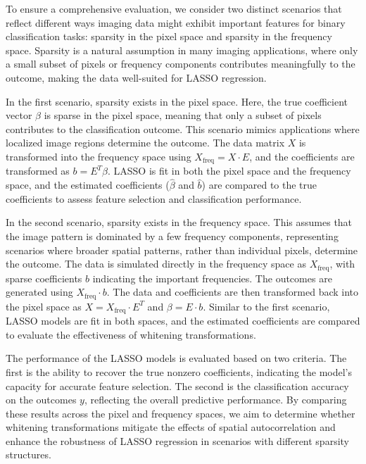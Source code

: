 \documentclass[12pt]{article}
\begin{document}
To ensure a comprehensive evaluation, we consider two distinct scenarios that reflect different ways imaging data might exhibit important features for binary classification tasks: sparsity in the pixel space and sparsity in the frequency space. Sparsity is a natural assumption in many imaging applications, where only a small subset of pixels or frequency components contributes meaningfully to the outcome, making the data well-suited for LASSO regression.

In the first scenario, sparsity exists in the pixel space. Here, the true coefficient vector \( \beta \) is sparse in the pixel space, meaning that only a subset of pixels contributes to the classification outcome. This scenario mimics applications where localized image regions determine the outcome. The data matrix \( X \) is transformed into the frequency space using \( X_{\text{freq}} = X \cdot E \), and the coefficients are transformed as \( b = E^T \beta \). LASSO is fit in both the pixel space and the frequency space, and the estimated coefficients (\( \hat{\beta} \) and \( \hat{b} \)) are compared to the true coefficients to assess feature selection and classification performance.

In the second scenario, sparsity exists in the frequency space. This assumes that the image pattern is dominated by a few frequency components, representing scenarios where broader spatial patterns, rather than individual pixels, determine the outcome. The data is simulated directly in the frequency space as \( X_{\text{freq}} \), with sparse coefficients \( b \) indicating the important frequencies. The outcomes are generated using \( X_{\text{freq}} \cdot b \). The data and coefficients are then transformed back into the pixel space as \( X = X_{\text{freq}} \cdot E^T \) and \( \beta = E \cdot b \). Similar to the first scenario, LASSO models are fit in both spaces, and the estimated coefficients are compared to evaluate the effectiveness of whitening transformations.

The performance of the LASSO models is evaluated based on two criteria. The first is the ability to recover the true nonzero coefficients, indicating the model's capacity for accurate feature selection. The second is the classification accuracy on the outcomes \( y \), reflecting the overall predictive performance. By comparing these results across the pixel and frequency spaces, we aim to determine whether whitening transformations mitigate the effects of spatial autocorrelation and enhance the robustness of LASSO regression in scenarios with different sparsity structures.
\end{document}
